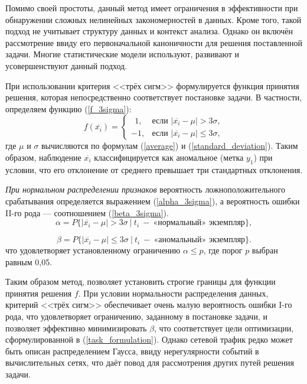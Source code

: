 Помимо своей простоты, данный метод имеет ограничения в эффективности при обнаружении сложных нелинейных закономерностей в данных. Кроме того, такой подход не учитывает структуру данных и контекст анализа. Однако он включён рассмотрение ввиду его первоначальной каноничности для решения поставленной задачи. Многие статистические модели используют, развивают и усовершенствуют данный подход.

При использовании критерия <<трёх сигм>> формулируется функция принятия решения, которая непосредственно соответствует постановке задачи. В частности, определяем функцию (\ref{f_3sigma}):
\begin{equation}\label{f_3sigma}
    f(\overline{x_i}) = \begin{cases}
         \ \ 1, & \text{если } |\overline{x_i} - \mu| > 3\sigma, \\
        -1, & \text{если } |\overline{x_i} - \mu| \le 3\sigma,
    \end{cases}
\end{equation}
где $\mu$ и $\sigma$ вычисляются по формулам (\ref{average}) и (\ref{standard_deviation}). Таким образом, наблюдение $\overline{x_i}$ классифицируется как аномальное (метка $y_1$) при условии, что его отклонение от среднего превышает три стандартных отклонения.

\textit{При нормальном распределении признаков} вероятность ложноположительного срабатывания определяется выражением (\ref{alpha_3sigma}), а вероятность ошибки II-го рода --- соотношением (\ref{beta_3sigma}).
\begin{equation}\label{alpha_3sigma}
    \alpha = P\Big\{ |\overline{x_i} - \mu| > 3\sigma\ \Big|\ t_i\ -\ \text{«нормальный» экземпляр} \Big\},
\end{equation}

\begin{equation}\label{beta_3sigma}
    \beta = P\Big\{ |\overline{x_i} - \mu| \le 3\sigma\ \Big|\ t_i\ -\ \text{«аномальный» экземпляр} \Big\}.
\end{equation}
что удовлетворяет установленному ограничению $\alpha \leq p$, где порог $p$ выбран равным 0,05.

Таким образом метод, позволяет установить строгие границы для функции принятия решения $f$. При условии нормальности распределения данных, критерий <<трёх сигм>> обеспечивает очень малую вероятность ошибки I-го рода, что удовлетворяет ограничению, заданному в постановке задачи, и позволяет эффективно минимизировать $\beta$, что соответствует цели оптимизации, сформулированной в (\ref{task_formulation}). Однако сетевой трафик редко может быть описан распределением Гаусса, ввиду нерегулярности событий в вычислительных сетях, что даёт повод для рассмотрения других путей решения задачи.
